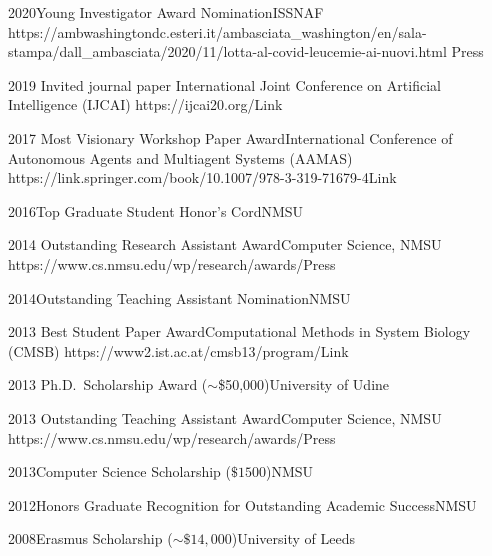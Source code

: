 \documentclass[localFont,alternative]{documentMETADATA}
\begin{document}
\begin{awards}
\awardentry
  	{2020}{Young Investigator Award Nomination}{ISSNAF} 
	{https://ambwashingtondc.esteri.it/ambasciata\_washington/en/sala-stampa/dall\_ambasciata/2020/11/lotta-al-covid-leucemie-ai-nuovi.html}
	{Press}

	\awardentry
	{2019}
	{Invited journal paper}%
	{International Joint Conference on Artificial Intelligence (IJCAI)}
	{https://ijcai20.org/}{Link}

	\awardentry
	{2017}
	{Most Visionary Workshop Paper Award}{International Conference of 
	Autonomous Agents and Multiagent Systems (AAMAS)}
   {https://link.springer.com/book/10.1007/978-3-319-71679-4}{Link}

\awardentryN
{2016}{Top Graduate Student Honor's Cord}{NMSU}

\awardentry
	{2014}
	{Outstanding Research Assistant Award}{Computer Science, NMSU}
	{https://www.cs.nmsu.edu/wp/research/awards/}{Press}

\awardentryN
	{2014}{Outstanding Teaching Assistant Nomination}{NMSU}

	\awardentry
	{2013}
	{Best Student Paper Award}{Computational Methods in System Biology (CMSB)}
	{https://www2.ist.ac.at/cmsb13/program/}{Link}

\awardentryN
	{2013}
	{Ph.D.~Scholarship Award ($\sim$\$50,000)}{University of Udine}

\awardentry 
   {2013}
   {Outstanding Teaching Assistant Award}{Computer Science, NMSU}
   {https://www.cs.nmsu.edu/wp/research/awards/}{Press}

\awardentryN
{2013}{Computer Science Scholarship ($\$ 1500$)}{NMSU}

\awardentryN
{2012}{Honors Graduate Recognition for Outstanding Academic Success}{NMSU}

\awardentryN
{2008}{Erasmus Scholarship ($\sim \$ 14,000$)}{University of Leeds}

\end{awards}

\end{document}
